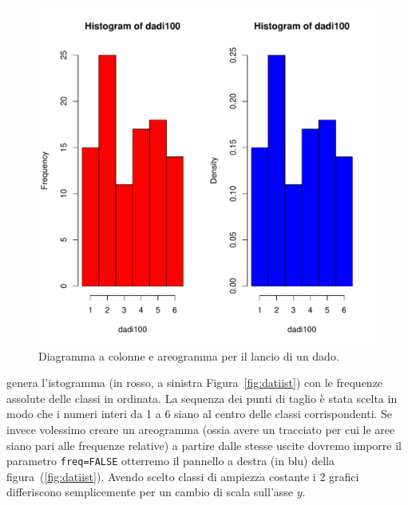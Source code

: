 \documentclass[onecolumn,12pt]{book}\usepackage[]{graphicx}\usepackage[]{color}
\makeatletter
\def\maxwidth{ %
  \ifdim\Gin@nat@width>\linewidth
    \linewidth
  \else
    \Gin@nat@width
  \fi
}
\newenvironment{knitrout}{}{} %
\makeatother
\begin{document}
\begin{figure}[htbp]
\begin{center}
\begin{knitrout}
\color{fgcolor}
\includegraphics[width=\maxwidth]{figure/unnamed-chunk-105-1} 

\end{knitrout}
\caption{Diagramma a colonne e areogramma per il lancio di un dado.}
\label{fig:datidado}
\end{center}
\end{figure}
genera l'istogramma (in rosso, a sinistra Figura~\ref{fig:datiist}) con le frequenze assolute delle classi in ordinata. La sequenza dei punti di taglio \`e stata scelta in modo che i numeri interi da 1 a 6 siano al centro delle classi corrispondenti. Se invece volessimo creare un areogramma  (ossia avere un tracciato per cui le aree siano pari alle frequenze relative) a partire dalle stesse uscite dovremo imporre il parametro \texttt{freq=FALSE} otterremo il pannello a destra (in blu) della figura~(\ref{fig:datiist}). Avendo scelto classi di ampiezza costante i 2 grafici differiscono semplicemente per un cambio di scala sull'asse $y$.
\end{document}
